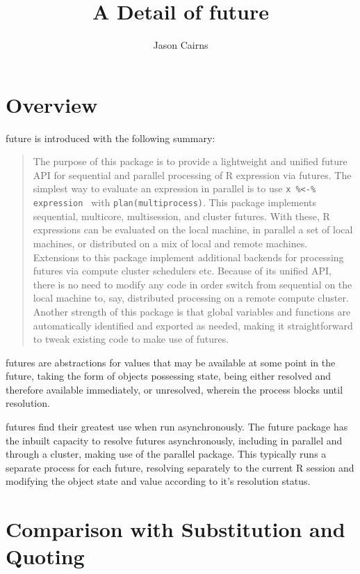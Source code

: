 \documentclass[10pt,a4paper]{article}
\begin{document}
\title{A Detail of future}
\author{Jason Cairns}
  
\maketitle{}

\section{Overview}
\label{sec:overview}
\nocite{bengtsson19:_futur_r}

future is introduced with the following summary: \blockquote{The
  purpose of this package is to provide a lightweight and unified
  future API for sequential and parallel processing of R expression
  via futures. The simplest way to evaluate an expression in parallel
  is to use \texttt{x \%<-\% { expression }} with
  \texttt{plan(multiprocess)}. This package implements sequential,
  multicore, multisession, and cluster futures. With these, R
  expressions can be evaluated on the local machine, in parallel a set
  of local machines, or distributed on a mix of local and remote
  machines. Extensions to this package implement additional backends
  for processing futures via compute cluster schedulers etc. Because
  of its unified API, there is no need to modify any code in order
  switch from sequential on the local machine to, say, distributed
  processing on a remote compute cluster. Another strength of this
  package is that global variables and functions are automatically
  identified and exported as needed, making it straightforward to
  tweak existing code to make use of futures.\cite{bengtsson20}}
futures are abstractions for values that may be available at some
point in the future, taking the form of objects possessing state,
being either resolved and therefore available immediately, or
unresolved, wherein the process blocks until resolution.

futures find their greatest use when run asynchronously. The future
package has the inbuilt capacity to resolve futures asynchronously,
including in parallel and through a cluster, making use of the
parallel package. This typically runs a separate process for each
future, resolving separately to the current R session and modifying
the object state and value according to it's resolution status.

\section{Comparison with Substitution and Quoting}
\label{sec:comparison-with-non}
\end{document}
